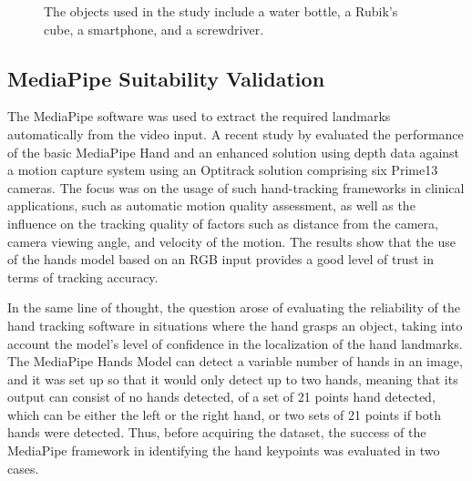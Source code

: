 \begin{figure}[ht]
\captionsetup{width=0.6\textwidth}
\centering
{}
\caption{The objects used in the study include a water bottle, a Rubik’s cube, a smartphone, and a screwdriver.}
\label{fig:GraspedObjects}
\end{figure}

\subsection{MediaPipe Suitability Validation}

The MediaPipe software was used to extract the required landmarks automatically from the video input. A recent study by \textcite{Amprimo2023} evaluated the performance of the basic MediaPipe Hand \cite{Zhang2020} and an enhanced solution using depth data \cite{Amprimo2022} against a motion capture system using an Optitrack solution comprising six Prime13 cameras. The focus was on the usage of such hand-tracking frameworks in clinical applications, such as automatic motion quality assessment, as well as the influence on the tracking quality of factors such as distance from the camera, camera viewing angle, and velocity of the motion. The results show that the use of the hands model based on an RGB input provides a good level of trust in terms of tracking accuracy.

In the same line of thought, the question arose of evaluating the reliability of the hand tracking software in situations where the hand grasps an object, taking into account the model's level of confidence \cite{Zhang2020} in the localization of the hand landmarks. The MediaPipe Hands Model can detect a variable number of hands in an image, and it was set up so that it would only detect up to two hands, meaning that its output can consist of no hands detected, of a set of 21 points hand detected, which can be either the left or the right hand, or two sets of 21 points if both hands were detected. Thus, before acquiring the dataset, the success of the MediaPipe framework in identifying the hand keypoints was evaluated in two cases.

